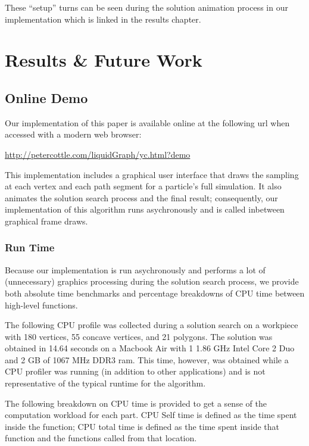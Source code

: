 
These ``setup'' turns can be seen during the solution animation process in our implementation which is linked in the results chapter.


					\chapter{Results \& Future Work}

\section{Online Demo}

Our implementation of this paper is available online at the following url when accessed with a modern web browser:

\begin{centering}
\url{http://petercottle.com/liquidGraph/yc.html?demo}
\end{centering}

This implementation includes a graphical user interface that draws the sampling at each vertex and each path segment for a particle's full simulation. It also animates the solution search process and the final result; consequently, our implementation of this algorithm runs asychronously and is called inbetween graphical frame draws.

	\subsection{Run Time}

Because our implementation is run asychronously and performs a lot of (unnecessary) graphics processing during the solution search process, we provide both absolute time benchmarks and percentage breakdowns of CPU time between high-level functions.

The following CPU profile was collected during a solution search on a workpiece with 180 vertices, 55 concave vertices, and 21 polygons. The solution was obtained in 14.64 seconds on a Macbook Air with 1 1.86 GHz Intel Core 2 Duo and 2 GB of 1067 MHz DDR3 ram. This time, however, was obtained while a CPU profiler was running (in addition to other applications) and is not representative of the typical runtime for the algorithm.

The following breakdown on CPU time is provided to get a sense of the computation workload for each part. CPU Self time is defined as the time spent inside the function; CPU total time is defined as the time spent inside that function and the functions called from that location.

